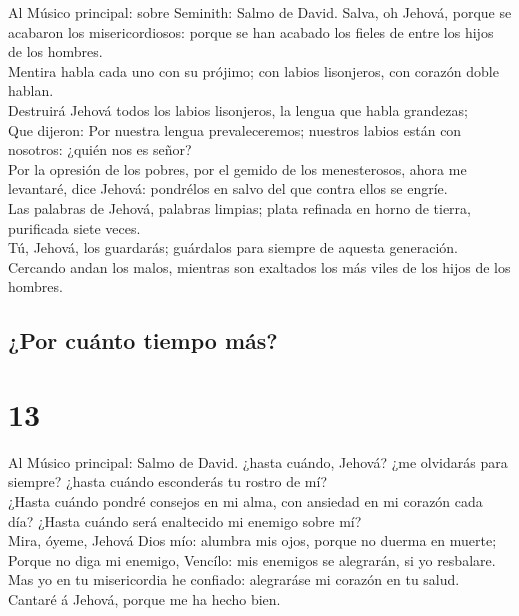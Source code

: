  Al Músico principal: sobre Seminith: Salmo de David.
Salva, oh Jehová, porque se acabaron los misericordiosos: porque se han
acabado los fieles de entre los hijos de los hombres.\\
 Mentira habla cada uno con su prójimo; con labios
lisonjeros, con corazón doble hablan.\\
 Destruirá Jehová todos los labios lisonjeros, la lengua
que habla grandezas;\\
 Que dijeron: Por nuestra lengua prevaleceremos; nuestros
labios están con nosotros: ¿quién nos es señor?\\
 Por la opresión de los pobres, por el gemido de los
menesterosos, ahora me levantaré, dice Jehová: pondrélos en salvo del
que contra ellos se engríe.\\
 Las palabras de Jehová, palabras limpias; plata refinada
en horno de tierra, purificada siete veces.\\
 Tú, Jehová, los guardarás; guárdalos para siempre de
aquesta generación.\\
 Cercando andan los malos, mientras son exaltados los más
viles de los hijos de los hombres.

\hypertarget{por-cuuxe1nto-tiempo-muxe1s}{%
\subsection{¿Por cuánto tiempo más?}\label{por-cuuxe1nto-tiempo-muxe1s}}

\hypertarget{section-12}{%
\section{13}\label{section-12}}

 Al Músico principal: Salmo de David. ¿hasta cuándo,
Jehová? ¿me olvidarás para siempre? ¿hasta cuándo esconderás tu rostro
de mí?\\
 ¿Hasta cuándo pondré consejos en mi alma, con ansiedad en
mi corazón cada día? ¿Hasta cuándo será enaltecido mi enemigo sobre
mí?\\
 Mira, óyeme, Jehová Dios mío: alumbra mis ojos, porque no
duerma en muerte;\\
 Porque no diga mi enemigo, Vencílo: mis enemigos se
alegrarán, si yo resbalare.\\
 Mas yo en tu misericordia he confiado: alegraráse mi
corazón en tu salud.\\
 Cantaré á Jehová, porque me ha hecho bien.

